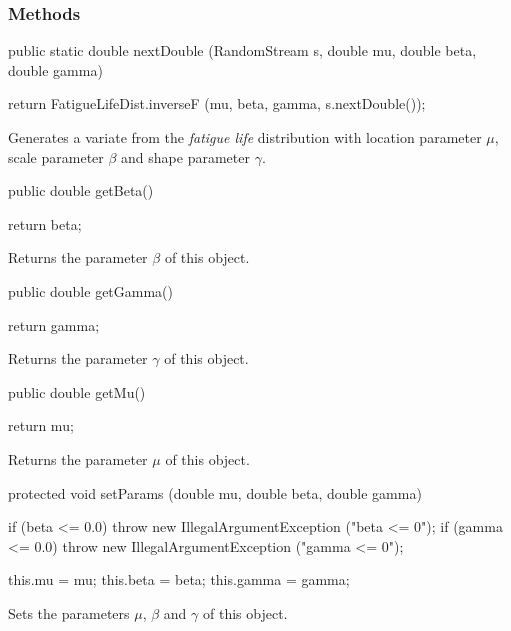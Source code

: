 \subsubsection* {Methods}
\begin{code}

   public static double nextDouble (RandomStream s, double mu, double beta,
                                    double gamma)\begin{hide} {
      return FatigueLifeDist.inverseF (mu, beta, gamma, s.nextDouble());
   }\end{hide}
\end{code}
\begin{tabb} Generates a variate from the {\em fatigue life\/} distribution
   with location parameter $\mu$, scale parameter $\beta$ and shape parameter
   $\gamma$.
\end{tabb}
\begin{code}

   public double getBeta()\begin{hide} {
      return beta;
   }\end{hide}
\end{code}
\begin{tabb} Returns the parameter $\beta$ of this object.
\end{tabb}
\begin{code}

   public double getGamma()\begin{hide} {
      return gamma;
   }\end{hide}
\end{code}
\begin{tabb} Returns the parameter $\gamma$ of this object.
\end{tabb}
\begin{code}

   public double getMu()\begin{hide} {
      return mu;
   }\end{hide}
\end{code}
\begin{tabb} Returns the parameter $\mu$ of this object.
\end{tabb}
\begin{hide}\begin{code}

   protected void setParams (double mu, double beta, double gamma) {
      if (beta <= 0.0)
         throw new IllegalArgumentException ("beta <= 0");
      if (gamma <= 0.0)
         throw new IllegalArgumentException ("gamma <= 0");
      
      this.mu = mu;
      this.beta = beta;
      this.gamma = gamma;
   }
\end{code}
\begin{tabb}
   Sets the parameters $\mu$, $\beta$ and $\gamma$ of this object.
\end{tabb}
\begin{code}
}
\end{code}
\end{hide}
